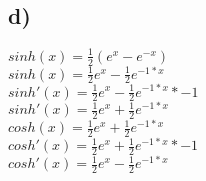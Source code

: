 \documentclass{article}
\begin{document}
	\subsection*{d)}
	$sinh(x) = \frac{1}{2}(e^x - e^{-x})$ \\
	$sinh(x) = \frac{1}{2}e^x - \frac{1}{2}e^{-1*x}$ \\
	$sinh'(x) = \frac{1}{2}e^x - \frac{1}{2}e^{-1*x}*-1$ \\
	$sinh'(x) = \frac{1}{2}e^x + \frac{1}{2}e^{-1*x}$ \\
	$cosh(x)  = \frac{1}{2}e^x + \frac{1}{2}e^{-1*x}$ \\
	$cosh'(x)  = \frac{1}{2}e^x + \frac{1}{2}e^{-1*x}*-1$ \\
	$cosh'(x)  = \frac{1}{2}e^x - \frac{1}{2}e^{-1*x}$ \\
\end{document}
